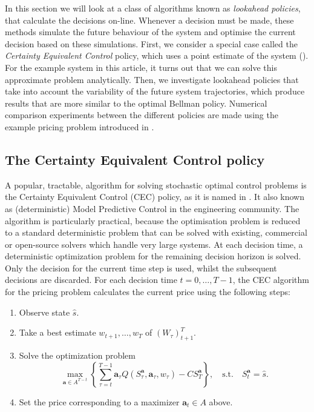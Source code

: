 \documentclass[main.tex]{subfiles}
\begin{document}
In this section we will look at a class of algorithms known as
\emph{lookahead policies}, that calculate the decisions on-line.
Whenever a decision must be made, these methods simulate the future
behaviour of the system and optimise the current decision based on
these simulations. First, we consider a special case called the
\emph{Certainty Equivalent Control} policy, which uses a point
estimate of the system (\citet[Ch.~6]{bertsekas2005dynamic}). For the
example system in this article, it turns out that we can solve
this approximate problem analytically.
Then, we investigate lookahead policies that take into account the
variability of the future system trajectories, which produce
results that are more similar to the optimal Bellman policy.
Numerical comparison experiments between the different policies are
made using the example pricing problem introduced in
.

\subsection{The Certainty Equivalent Control policy}
A popular, tractable, algorithm for solving stochastic optimal control
problems is the Certainty Equivalent Control (CEC) policy, as it is
named in \citet{bertsekas2005dynamic}.
It also known as (deterministic) Model
Predictive Control in the engineering community.
The algorithm is particularly practical, because the optimisation
problem is reduced to a standard deterministic problem that can
be solved with existing, commercial or open-source solvers which
handle very large systems.
At each decision time, a deterministic optimization problem for the
remaining decision horizon is solved. Only the decision for the
current time step is
used, whilst the subsequent decisions are discarded.
For each decision time $t=0,\dots,T-1$, the CEC algorithm for the pricing
problem calculates the current price using the following steps:
\begin{enumerate}
\item Observe state $\hat s$.
\item Take a best estimate $w_{t+1},\dots,w_T$ of ${(W_\tau)}_{t+1}^T$.
\item Solve the optimization problem
  \begin{equation}
    \max_{\mathbf a\in A^{T-t}}\left\{\sum_{\tau=t}^{T-1}\mathbf
      a_\tau Q(S_\tau^{\mathbf a},\mathbf
      a_\tau,w_{\tau})-CS_T^{\mathbf a}\right\},
    \quad \text{s.t.}\quad S_t^{\mathbf a}=\hat s.
  \end{equation}
\item Set the price corresponding to a maximizer
  $\mathbf a_t\in A$ above.
\end{enumerate}
\end{document}
